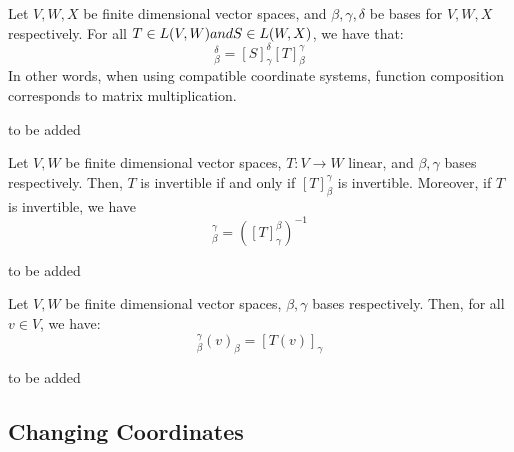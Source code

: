 \documentclass{article}
\begin{document}
\begin{thm}
Let $ V, W, X $ be finite dimensional vector spaces, and $ \beta, \gamma, \delta $ be bases for $ V, W, X $ respectively. \vsp
For all $ T \in \relax{L}(V, W) and S \in \relax{L}(W, X) $, we have that:
\begin{equation*}
    [S \circ T]_{\beta}^{\delta} = [S]_{\gamma}^{\delta}[T]_{\beta}^{\gamma}
\end{equation*}
In other words, when using compatible coordinate systems, function composition corresponds to matrix multiplication.
\end{thm}

\begin{pf}[source=Primary Source Material]
to be added
\end{pf}

\begin{thm}
Let $ V, W $ be finite dimensional vector spaces, $ T: V \rightarrow W $ linear, and $ \beta, \gamma $ bases respectively. Then, $ T $ is invertible if and only if $ [T]_{\beta}^{\gamma} $ is invertible. \vsp
Moreover, if $ T $ is invertible, we have
\begin{equation*}
    [T^{-1}]_{\beta}^{\gamma} = \left( [T]_{\gamma}^{\beta} \right)^{-1}
\end{equation*}
\end{thm}

\begin{pf}[source=Primary Source Material]
to be added
\end{pf}

\begin{thm}
Let $ V, W $ be finite dimensional vector spaces, $ \beta, \gamma $ bases respectively. Then, for all $ v \in V $, we have:
\begin{equation*}
[T]_{\beta}^{\gamma}(v)_{\beta} = [T(v)]_{\gamma}
\end{equation*}
\end{thm}

\begin{pf}[source=Primary Source Material]
to be added
\end{pf}

\subsection{Changing Coordinates}
\end{document}
